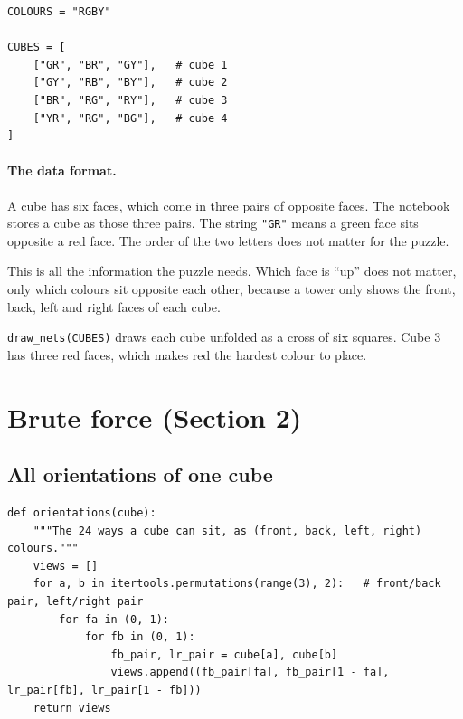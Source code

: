 \documentclass[11pt]{article}
\newcommand{\code}[1]{\texttt{#1}}
\begin{document}
\begin{lstlisting}
COLOURS = "RGBY"

CUBES = [
    ["GR", "BR", "GY"],   # cube 1
    ["GY", "RB", "BY"],   # cube 2
    ["BR", "RG", "RY"],   # cube 3
    ["YR", "RG", "BG"],   # cube 4
]
\end{lstlisting}

\paragraph{The data format.} A cube has six faces, which come in three pairs of
opposite faces. The notebook stores a cube as those three pairs. The string
\code{"GR"} means a green face sits opposite a red face. The order of the two
letters does not matter for the puzzle.

This is all the information the puzzle needs. Which face is ``up'' does not
matter, only which colours sit opposite each other, because a tower only shows
the front, back, left and right faces of each cube.

\code{draw\_nets(CUBES)} draws each cube unfolded as a cross of six squares.
Cube 3 has three red faces, which makes red the hardest colour to place.

\section{Brute force (Section 2)}

\subsection{All orientations of one cube}

\begin{lstlisting}
def orientations(cube):
    """The 24 ways a cube can sit, as (front, back, left, right) colours."""
    views = []
    for a, b in itertools.permutations(range(3), 2):   # front/back pair, left/right pair
        for fa in (0, 1):
            for fb in (0, 1):
                fb_pair, lr_pair = cube[a], cube[b]
                views.append((fb_pair[fa], fb_pair[1 - fa], lr_pair[fb], lr_pair[1 - fb]))
    return views
\end{lstlisting}
\end{document}
